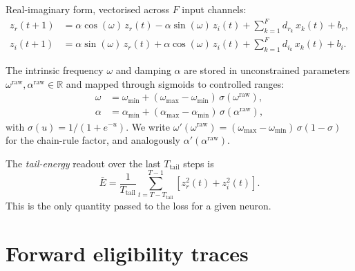 \documentclass[11pt]{article}
\newcommand{\R}{\mathbb{R}}
\newcommand{\zr}{z_r}
\newcommand{\zi}{z_i}
\newcommand{\dr}{d_r}
\newcommand{\di}{d_i}
\newcommand{\br}{b_r}
\newcommand{\bi}{b_i}
\begin{document}
Real-imaginary form, vectorised across $F$ input channels:
\begin{align}
\zr(t+1) &= \alpha \cos(\omega)\, \zr(t) - \alpha \sin(\omega)\, \zi(t)
            + \sum_{k=1}^F \dr_k\, x_k(t) + \br, \label{eq:osc-r}\\
\zi(t+1) &= \alpha \sin(\omega)\, \zr(t) + \alpha \cos(\omega)\, \zi(t)
            + \sum_{k=1}^F \di_k\, x_k(t) + \bi. \label{eq:osc-i}
\end{align}

The intrinsic frequency $\omega$ and damping $\alpha$ are stored in
unconstrained parameters $\omega^{\mathrm{raw}}, \alpha^{\mathrm{raw}}
\in \R$ and mapped through sigmoids to controlled ranges:
\begin{align}
\omega &= \omega_{\min} + (\omega_{\max} - \omega_{\min})\,\sigma(\omega^{\mathrm{raw}}),\\
\alpha &= \alpha_{\min}  + (\alpha_{\max}  - \alpha_{\min})\, \sigma(\alpha^{\mathrm{raw}}),
\end{align}
with $\sigma(u) = 1/(1+e^{-u})$. We write
$\omega'(\omega^{\mathrm{raw}}) = (\omega_{\max}-\omega_{\min})\,\sigma(1-\sigma)$
for the chain-rule factor, and analogously $\alpha'(\alpha^{\mathrm{raw}})$.

The \emph{tail-energy} readout over the last $T_{\mathrm{tail}}$ steps is
\begin{equation}
\bar E = \frac{1}{T_{\mathrm{tail}}} \sum_{t = T - T_{\mathrm{tail}}}^{T - 1}
         \left[\zr^2(t) + \zi^2(t)\right].
\label{eq:tail-energy}
\end{equation}
This is the only quantity passed to the loss for a given neuron.

\section{Forward eligibility traces}\label{sec:elig}
\end{document}
